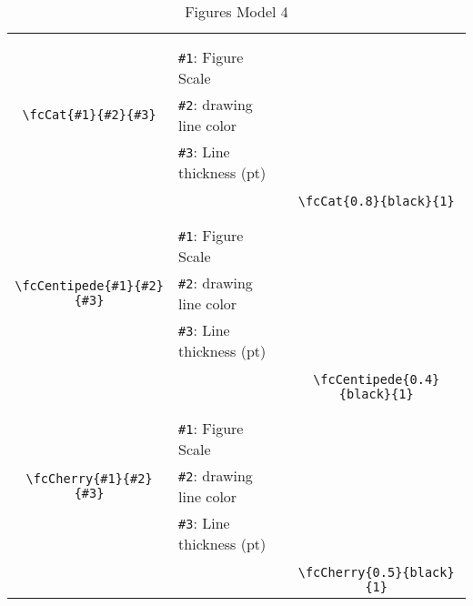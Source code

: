 \documentclass{article}
\begin{document}
\begin{table}[H]
\begin{tabular}{|c|l|c|}
	&&\multirow{5}{*}{\fcCat{0.8}{black}{1}}\\	&&\\	&\verb|#1|: Figure Scale &\\	\verb|\fcCat{#1}{#2}{#3}|&	\verb|#2|: drawing line color &\\	&\verb|#3|: Line thickness (pt) &\\ &&\\&&	\verb|\fcCat{0.8}{black}{1}|\\\hline 	
	&&\multirow{5}{*}{\fcCentipede{0.4}{black}{1}}\\	&&\\	&\verb|#1|: Figure Scale &\\	\verb|\fcCentipede{#1}{#2}{#3}|&	\verb|#2|: drawing line color &\\	&\verb|#3|: Line thickness (pt) &\\ &&\\&&	\verb|\fcCentipede{0.4}{black}{1}|\\\hline 	
	&&\multirow{5}{*}{\fcCherry{0.5}{black}{1}}\\	&&\\	&\verb|#1|: Figure Scale &\\	\verb|\fcCherry{#1}{#2}{#3}|&	\verb|#2|: drawing line color &\\	&\verb|#3|: Line thickness (pt) &\\ &&\\&&	\verb|\fcCherry{0.5}{black}{1}|\\\hline 	\hline\end{tabular}\caption{Figures Model 4}\label{tab4}\end{table}
\end{document}
